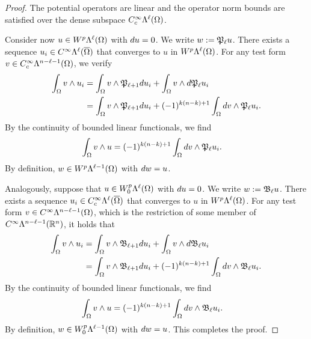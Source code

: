 \documentclass[12pt,a4paper]{article}
\begin{document}
\begin{proof}
    The potential operators are linear and the operator norm bounds are satisfied over the dense subspace $C^{\infty}_{c}\Lambda^{\ell}(\Omega)$.
    
    Consider now $u \in W^{p}\Lambda^{\ell}(\Omega)$ with $d u = 0$. 
    We write $w := {\mathfrak P}_{\ell  } u$. 
    There exists a sequence $u_{i} \in C^{\infty}\Lambda^{\ell}(\overline\Omega)$ that converges to $u$ in $W^{p}\Lambda^{\ell}(\Omega)$. 
    For any test form $v \in C^{\infty}_{c}\Lambda^{n-\ell-1}(\Omega)$, we verify 
    \begin{align*}
        \int_{\Omega} v \wedge u_{i} 
        &=
        \int_{\Omega} v \wedge {\mathfrak P}_{\ell+1} d u_{i}
        +
        \int_{\Omega} v \wedge d {\mathfrak P}_{\ell  } u_{i}
        \\&=
        \int_{\Omega} v \wedge {\mathfrak P}_{\ell+1} d u_{i}
        +
        (-1)^{k(n-k)+1}
        \int_{\Omega} d v \wedge {\mathfrak P}_{\ell  } u_{i}
        .
    \end{align*}
    By the continuity of bounded linear functionals, we find 
    \begin{align*}
        \int_{\Omega} v \wedge u 
        &=
        (-1)^{k(n-k)+1}
        \int_{\Omega} d v \wedge {\mathfrak P}_{\ell  } u_{i}
        .
    \end{align*}
    By definition, $w \in W^{p}\Lambda^{\ell-1}(\Omega)$ with $d w = u$.
    
    
    Analogously, suppose that $u \in W^{p}_{0}\Lambda^{\ell}(\Omega)$ with $d u = 0$. 
    We write $w := {\mathfrak B}_{\ell} u$. 
    There exists a sequence $u_{i} \in C^{\infty}_{c}\Lambda^{\ell}(\overline\Omega)$ that converges to $u$ in $W^{p}\Lambda^{\ell}(\Omega)$. 
    For any test form $v \in C^{\infty}\Lambda^{n-\ell-1}(\Omega)$, 
    which is the restriction of some member of $C^{\infty}\Lambda^{n-\ell-1}({\mathbb R}^{n})$, 
    it holds that 
    \begin{align*}
        \int_{\Omega} v \wedge u_{i} 
        &=
        \int_{\Omega} v \wedge {\mathfrak B}_{\ell+1} d u_{i}
        +
        \int_{\Omega} v \wedge d {\mathfrak B}_{\ell  } u_{i}
        \\&=
        \int_{\Omega} v \wedge {\mathfrak B}_{\ell+1} d u_{i}
        +
        (-1)^{k(n-k)+1}
        \int_{\Omega} d v \wedge {\mathfrak B}_{\ell  } u_{i}
        .
    \end{align*}
    By the continuity of bounded linear functionals, we find 
    \begin{align*}
        \int_{\Omega} v \wedge u 
        &=
        (-1)^{k(n-k)+1}
        \int_{\Omega} d v \wedge {\mathfrak B}_{\ell  } u_{i}
        .
    \end{align*}
    By definition, $w \in W^{p}_{0}\Lambda^{\ell-1}(\Omega)$ with $d w = u$.
    This completes the proof. 
\end{proof}
\end{document}
